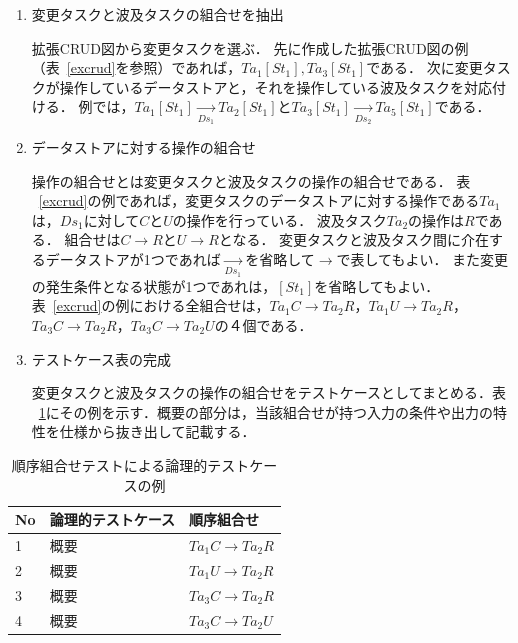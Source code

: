 \documentclass[a4paper,11pt]{jreport}
\begin{document}
\begin{enumerate}
\item 変更タスクと波及タスクの組合せを抽出

拡張CRUD図から変更タスクを選ぶ．
先に作成した拡張CRUD図の例（表~\ref{excrud}を参照）であれば，$Ta_1[St_1],Ta_3[St_1]$である．
次に変更タスクが操作しているデータストアと，それを操作している波及タスクを対応付ける．
例では，$Ta_1[St_1]  \xrightarrow[Ds_1]{} Ta_2[St_1]$と$Ta_3[St_1]  \xrightarrow[Ds_2]{}  Ta_5[St_1]$である．


\item データストアに対する操作の組合せ

操作の組合せとは変更タスクと波及タスクの操作の組合せである．
表 ~\ref{excrud}の例であれば，変更タスクのデータストアに対する操作である$Ta_1$は，$Ds_1$に対して$C$と$U$の操作を行っている．
波及タスク$Ta_2$の操作は$R$である．
組合せは$C  \rightarrow R$と$U  \rightarrow R$となる．
変更タスクと波及タスク間に介在するデータストアが1つであれば$\xrightarrow[Ds_1]{}$を省略して$\rightarrow$で表してもよい．
また変更の発生条件となる状態が1つであれは，$[St_1]$を省略してもよい．
表~\ref{excrud}の例における全組合せは，$Ta_1C \rightarrow Ta_2R$，$Ta_1U \rightarrow Ta_2R$，$Ta_3C \rightarrow Ta_2R$，$Ta_3C \rightarrow Ta_2U$の４個である．




\item テストケース表の完成

変更タスクと波及タスクの操作の組合せをテストケースとしてまとめる．表 ~\ref{TCLISTSAMPLE}にその例を示す．概要の部分は，当該組合せが持つ入力の条件や出力の特性を仕様から抜き出して記載する．


\end{enumerate}

\begin{table}[t]
  \centering
  \caption{順序組合せテストによる論理的テストケースの例}
    \begin{tabular}{l|l|l}
    No & 論理的テストケース & 順序組合せ \\
    \hline
    1 & 概要 & $Ta_1C \rightarrow Ta_2R$ \\
    \hline
    2 & 概要 & $Ta_1U \rightarrow Ta_2R$ \\
    \hline
    3 & 概要 & $Ta_3C \rightarrow Ta_2R$ \\
    \hline
    4 & 概要 & $Ta_3C \rightarrow Ta_2U$ \\
    \hline
    \end{tabular}%
\label{TCLISTSAMPLE}
\end{table}%
\end{document}
